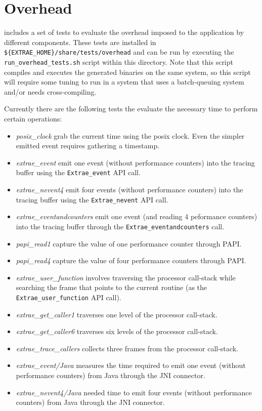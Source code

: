 \chapter{Overhead}\label{cha:Overhead}

\TRACE includes a set of tests to evaluate the overhead imposed to the application by different components.
These tests are installed in \texttt{\$\{EXTRAE\_HOME\}/share/tests/overhead} and can be run by executing the \texttt{run\_overhead\_tests.sh} script within this directory.
Note that this script compiles and executes the generated binaries on the same system, so this script will require some tuning to run in a system that uses a batch-queuing system and/or needs cross-compiling.

Currently there are the following tests the evaluate the necessary time to perform certain operations:
\begin{itemize}
\item \textit{posix\_clock} grab the current time using the posix clock. Even the simpler emitted event requires gathering a timestamp.
\item \textit{extrae\_event} emit one event (without performance counters) into the tracing buffer using the \texttt{Extrae\_event} API call.
\item \textit{extrae\_nevent4} emit four events (without performance counters) into the tracing buffer using the \texttt{Extrae\_nevent} API call.
\item \textit{extrae\_eventandcounters} emit one event (and reading 4 peformance counters) into the tracing buffer through the \texttt{Extrae\_eventandcounters} call.
\item \textit{papi\_read1} capture the value of one performance counter through PAPI.
\item \textit{papi\_read4} capture the value of four performance counters through PAPI.
\item \textit{extrae\_user\_function} involves traversing the processor call-stack while searching the frame that points to the current routine (as the \texttt{Extrae\_user\_function} API call).
\item \textit{extrae\_get\_caller1} traverses one level of the processor call-stack.
\item \textit{extrae\_get\_caller6} traverses six levels of the processor call-stack.
\item \textit{extrae\_trace\_callers} collects three frames from the processor call-stack.
\item \textit{extrae\_event/Java} measures the time required to emit one event (without performance counters) from Java through the JNI connector.
\item \textit{extrae\_nevent4/Java} needed time to emit four events (without performance counters) from Java through the JNI connector.
\end{itemize}

